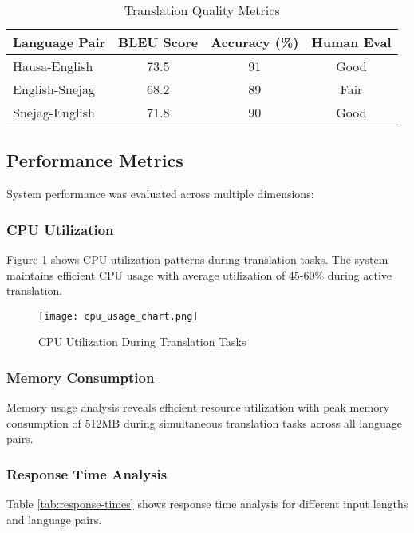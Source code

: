 \documentclass[conference]{IEEEtran}
\begin{document}
\begin{table}[htbp]
\centering
\caption{Translation Quality Metrics}
\label{tab:translation-quality}
\begin{tabular}{@{}lccc@{}}
\toprule
Language Pair & BLEU Score & Accuracy (\%) & Human Eval \\
\midrule
Hausa-English & 73.5 & 91 & Good \\
English-Snejag & 68.2 & 89 & Fair \\
Snejag-English & 71.8 & 90 & Good \\
\bottomrule
\end{tabular}
\end{table}

\subsection{Performance Metrics}

System performance was evaluated across multiple dimensions:

\subsubsection{CPU Utilization}

Figure \ref{fig:cpu-usage} shows CPU utilization patterns during translation tasks. The system maintains efficient CPU usage with average utilization of 45-60\% during active translation.

\begin{figure}[htbp]
\centering
\texttt{[image: cpu\_usage\_chart.png]}
\caption{CPU Utilization During Translation Tasks}
\label{fig:cpu-usage}
\end{figure}

\subsubsection{Memory Consumption}

Memory usage analysis reveals efficient resource utilization with peak memory consumption of 512MB during simultaneous translation tasks across all language pairs.

\subsubsection{Response Time Analysis}

Table \ref{tab:response-times} shows response time analysis for different input lengths and language pairs.
\end{document}
